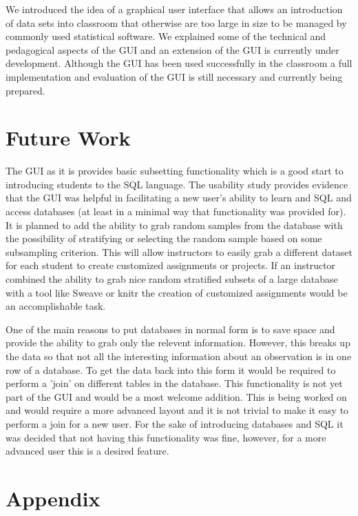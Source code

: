 \documentclass[11pt]{tise_style}
\begin{document}
We introduced the idea of a graphical user interface that allows an introduction of data sets into classroom that otherwise are too large in size to be managed by commonly used statistical software. We explained some of the technical and pedagogical aspects of the GUI and an extension of the GUI is currently under development. Although the GUI has been used successfully in the classroom a full implementation and evaluation of the GUI is still necessary and currently being prepared.


\section{{Future Work}}

The GUI as it is provides basic subsetting functionality which is a good start to introducing students to the SQL language.  The usability study provides evidence that the GUI was helpful in facilitating a new user's ability to learn and SQL and access databases (at least in a minimal way that functionality was provided for).  It is planned to add the ability to grab random samples from the database with the possibility of stratifying or selecting the random sample based on some subsampling criterion.  This will allow instructors to easily grab a different dataset for each student to create customized assignments or projects.  If an instructor combined the ability to grab nice random stratified subsets of a large database with a tool like Sweave or knitr \citet{knitr} the creation of customized assignments would be an accomplishable task.

One of the main reasons to put databases in normal form \citet{normalform:1983} is to save space and provide the ability to grab only the relevent information.  However, this breaks up the data so that not all the interesting information about an observation is in one row of a database.  To get the data back into this form it would be required to perform a 'join' on different tables in the database.  This functionality is not yet part of the GUI and would be a most welcome addition.  This is being worked on and would require a more advanced layout and it is not trivial to make it easy to perform a join for a new user.  For the sake of introducing databases and SQL it was decided that not having this functionality was fine, however, for a more advanced user this is a desired feature.

\newpage

\newpage
\section{Appendix}
\end{document}
